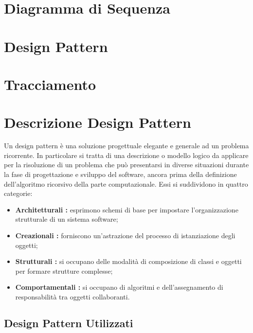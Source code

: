 \section{Diagramma di Sequenza}



\section{Design Pattern}

\section{Tracciamento}




\appendix



\section{Descrizione Design Pattern}

Un design pattern è una soluzione progettuale elegante e generale ad un problema ricorrente. In particolare si tratta di una descrizione o modello logico da applicare per la risoluzione di un problema che può presentarsi in diverse situazioni durante la fase di progettazione e sviluppo del software, ancora prima della definizione dell'algoritmo ricorsivo della parte computazionale. Essi si suddividono in quattro categorie: \

\begin{itemize}
	\item \textbf{Architetturali :} esprimono schemi di base per impostare l'organizzazione strutturale di un sistema software;
	\item \textbf{Creazionali :} forniscono un'astrazione del processo di istanziazione degli oggetti;
	\item \textbf{Strutturali :} si occupano delle modalità di composizione di classi e oggetti per formare strutture complesse;
	\item \textbf{Comportamentali :} si occupano di algoritmi e dell'assegnamento di responsabilità tra oggetti collaboranti.

\end{itemize}

\subsection{Design Pattern Utilizzati}

